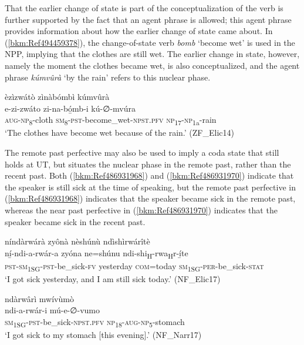 That the earlier change of state is part of the conceptualization of the verb is further supported by the fact that an agent phrase is allowed; this agent phrase provides information about how the earlier change of state came about. In (\ref{bkm:Ref494459378}), the change-of-state verb \textit{bomb} ‘become wet’ is used in the NPP, implying that the clothes are still wet. The earlier change in state, however, namely the moment the clothes became wet, is also conceptualized, and the agent phrase \textit{kúmvûrà} ‘by the rain’ refers to this nuclear phase.

\ea
\label{bkm:Ref494459378}
èzìzwátò zìnàbómbì kúmvûrà\\
\gll e-zi-zwáto    zi-na-bó̲mb-i      kú-∅-mvúra\\
\textsc{aug}-\textsc{np}\textsubscript{8}-cloth  \textsc{sm}\textsubscript{8}-\textsc{pst}-become\_wet-\textsc{npst}.\textsc{pfv}  \textsc{np}\textsubscript{17}-\textsc{np}\textsubscript{1a}-rain\\
\glt ‘The clothes have become wet because of the rain.’ (ZF\_Elic14)
\z

The remote past perfective may also be used to imply a coda state that still holds at UT, but situates the nuclear phase in the remote past, rather than the recent past. Both (\ref{bkm:Ref486931968}) and (\ref{bkm:Ref486931970}) indicate that the speaker is still sick at the time of speaking, but the remote past perfective in (\ref{bkm:Ref486931968}) indicates that the speaker became sick in the remote past, whereas the near past perfective in (\ref{bkm:Ref486931970}) indicates that the speaker became sick in the recent past.

\ea
\label{bkm:Ref486931968}
níndàrwárà zyônà nèshúnù ndìshìrwárîtè\\
\gll ní̲-ndi-a-rwár-a    zyóna    ne=shúnu  ndi-shi\textsubscript{H}-rwa\textsubscript{H}r-í̲te\\
\textsc{pst}-\textsc{sm}\textsubscript{1SG}-\textsc{pst}-be\_sick-\textsc{fv}  yesterday  \textsc{com}=today  \textsc{sm}\textsubscript{1SG}-\textsc{per}-be\_sick-\textsc{stat}\\
\glt ‘I got sick yesterday, and I am still sick today.’ (NF\_Elic17)
\z

\ea
\label{bkm:Ref486931970}
ndàrwârì mwívùmò\\
\gll ndi-a-rwár-i        mú-e-∅-vumo\\
\textsc{sm}\textsubscript{1SG}-\textsc{pst}-be\_sick-\textsc{npst}.\textsc{pfv}  \textsc{np}\textsubscript{18}-\textsc{aug}-\textsc{np}\textsubscript{5}-stomach\\
\glt ‘I got sick to my stomach [this evening].’ (NF\_Narr17)
\z

